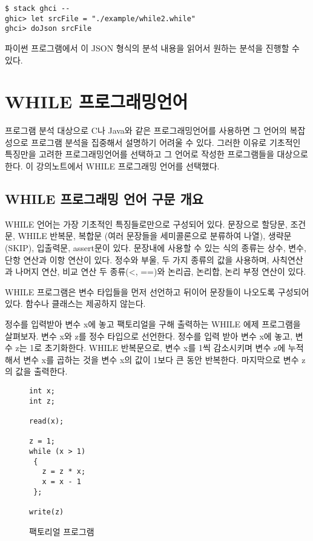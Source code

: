 \documentclass[a4paper]{book}
\begin{document}
\begin{verbatim}
$ stack ghci --
ghic> let srcFile = "./example/while2.while"
ghci> doJson srcFile
\end{verbatim}

파이썬 프로그램에서 이 JSON 형식의 분석 내용을 읽어서 원하는 분석을
진행할 수 있다.

\chapter{WHILE 프로그래밍언어}

프로그램 분석 대상으로 C나 Java와 같은 프로그래밍언어를 사용하면 그
언어의 복잡성으로 프로그램 분석을 집중해서 설명하기 어려울 수 있다.
그러한 이유로 기초적인 특징만을 고려한 프로그래밍언어를 선택하고 그
언어로 작성한 프로그램들을 대상으로 한다. 이 강의노트에서 WHILE
프로그래밍 언어를 선택했다.

\section{WHILE 프로그래밍 언어 구문  개요}

WHILE 언어는 가장 기초적인 특징들로만으로 구성되어 있다. 문장으로
할당문, 조건문, WHILE 반복문, 복합문 (여러 문장들을 세미콜론으로
분류하여 나열), 생략문(SKIP), 입출력문, assert문이 있다. 문장내에
사용할 수 있는 식의 종류는 상수, 변수, 단항 연산과 이항 연산이
있다. 정수와 부울, 두 가지 종류의 값을 사용하며, 사칙연산과 나머지
연산, 비교 연산 두 종류(\textless, ==)와 논리곱, 논리합, 논리 부정
연산이 있다.

WHILE 프로그램은 변수 타입들을 먼저 선언하고 뒤이어 문장들이 나오도록
구성되어 있다. 함수나 클래스는 제공하지 않는다.

정수를 입력받아 변수 x에 놓고 팩토리얼을 구해 출력하는 WHILE 에제
프로그램을 살펴보자. 변수 x와 z를 정수 타입으로 선언한다. 정수를 입력
받아 변수 x에 놓고, 변수 z는 1로 초기화한다. WHILE 반복문으로, 변수
x를 1씩 감소시키며 변수 z에 누적해서 변수 x를 곱하는 것을 변수 x의
값이 1보다 큰 동안 반복한다. 마지막으로 변수 z의 값을 출력한다.

\begin{figure}[ht]
\begin{center}
\begin{minipage}[h]{.4\textwidth}
\begin{lstlisting}
int x;
int z;

read(x);

z = 1;
while (x > 1)
 {
   z = z * x;
   x = x - 1
 };

write(z)
\end{lstlisting}
\end{minipage}
\end{center}
\caption{팩토리얼 프로그램}
\label{fig:factorial}
\end{figure}
\end{document}
